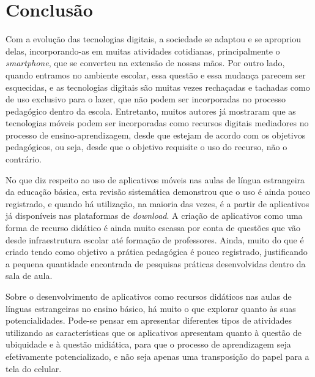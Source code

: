 \documentclass{textolivre}
\begin{document}
\section{Conclusão}
Com a evolução das tecnologias digitais, a sociedade se adaptou e se apropriou delas, incorporando-as em muitas atividades cotidianas, principalmente o \emph{smartphone}, que se converteu na extensão de nossas mãos. Por outro lado, quando entramos no ambiente escolar, essa questão e essa mudança parecem ser esquecidas, e as tecnologias digitais são muitas vezes rechaçadas e tachadas como de uso exclusivo para o lazer, que não podem ser incorporadas no processo pedagógico dentro da escola. Entretanto, muitos autores \cite{bannell2016, gardner2014, karsenti2014, perezgomez2012, saccol2011, unesco} já mostraram que as tecnologias móveis podem ser incorporadas como recursos digitais mediadores no processo de ensino-aprendizagem, desde que estejam de acordo com os objetivos pedagógicos, ou seja, desde que o objetivo requisite o uso do recurso, não o contrário. 

No que diz respeito ao uso de aplicativos móveis nas aulas de língua estrangeira da educação básica, esta revisão sistemática demonstrou que o uso é ainda pouco registrado, e quando há utilização, na maioria das vezes, é a partir de aplicativos já disponíveis nas plataformas de \emph{download}. A criação de aplicativos como uma forma de recurso didático é ainda muito escassa por conta de questões que vão desde infraestrutura escolar até formação de professores.  Ainda, muito do que é criado tendo como objetivo a prática pedagógica é pouco registrado, justificando a pequena quantidade encontrada de pesquisas práticas desenvolvidas dentro da sala de aula.

Sobre o desenvolvimento de aplicativos como recursos didáticos nas aulas de línguas estrangeiras no ensino básico, há muito o que explorar quanto às suas potencialidades. Pode-se pensar em apresentar diferentes tipos de atividades utilizando as características que os aplicativos apresentam quanto à questão de ubiquidade e à questão midiática, para que o processo de aprendizagem seja efetivamente potencializado, e não seja apenas uma transposição do papel para a tela do celular. 



\printbibliography\label{sec-bib}
\end{document}
